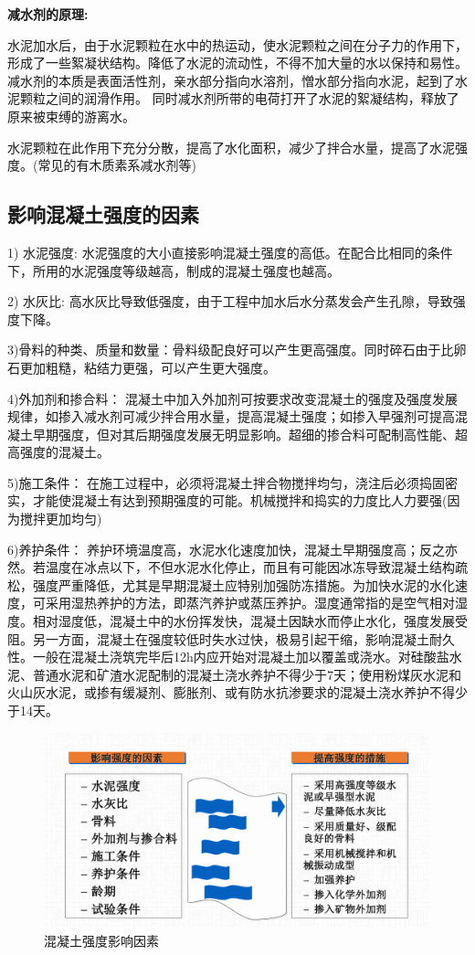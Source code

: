\documentclass[12pt, a4paper, oneside, UTF8]{ctexbook}
\begin{document}
\textbf{减水剂的原理:}

水泥加水后，由于水泥颗粒在水中的热运动，使水泥颗粒之间在分子力的作用下，形成了一些絮凝状结构。降低了水泥的流动性，不得不加大量的水以保持和易性。
减水剂的本质是表面活性剂，亲水部分指向水溶剂，憎水部分指向水泥，起到了水泥颗粒之间的润滑作用。
同时减水剂所带的电荷打开了水泥的絮凝结构，释放了原来被束缚的游离水。

水泥颗粒在此作用下充分分散，提高了水化面积，减少了拌合水量，提高了水泥强度。(常见的有木质素系减水剂等)

\subsection{影响混凝土强度的因素}

1) 水泥强度: 水泥强度的大小直接影响混凝土强度的高低。在配合比相同的条件下，所用的水泥强度等级越高，制成的混凝土强度也越高。

2) 水灰比: 高水灰比导致低强度，由于工程中加水后水分蒸发会产生孔隙，导致强度下降。

3)骨料的种类、质量和数量：骨料级配良好可以产生更高强度。同时碎石由于比卵石更加粗糙，粘结力更强，可以产生更大强度。

4)外加剂和掺合料：
混凝土中加入外加剂可按要求改变混凝土的强度及强度发展规律，如掺入减水剂可减少拌合用水量，提高混凝土强度；如掺入早强剂可提高混凝土早期强度，但对其后期强度发展无明显影响。超细的掺合料可配制高性能、超高强度的混凝土。

5)施工条件：
在施工过程中，必须将混凝土拌合物搅拌均匀，浇注后必须捣固密实，才能使混凝土有达到预期强度的可能。机械搅拌和捣实的力度比人力要强(因为搅拌更加均匀)

6)养护条件：
养护环境温度高，水泥水化速度加快，混凝土早期强度高；反之亦然。若温度在冰点以下，不但水泥水化停止，而且有可能因冰冻导致混凝土结构疏松，强度严重降低，尤其是早期混凝土应特别加强防冻措施。为加快水泥的水化速度，可采用湿热养护的方法，即蒸汽养护或蒸压养护。湿度通常指的是空气相对湿度。相对湿度低，混凝土中的水份挥发快，混凝土因缺水而停止水化，强度发展受阻。另一方面，混凝土在强度较低时失水过快，极易引起干缩，影响混凝土耐久性。一般在混凝土浇筑完毕后12h内应开始对混凝土加以覆盖或浇水。对硅酸盐水泥、普通水泥和矿渣水泥配制的混凝土浇水养护不得少于7天；使用粉煤灰水泥和火山灰水泥，或掺有缓凝剂、膨胀剂、或有防水抗渗要求的混凝土浇水养护不得少于14天。

\begin{figure}[H]
	\centering
	\includegraphics[width=0.7\linewidth]{../figure/qiangdu.png} %
	\caption{混凝土强度影响因素}
	\label{fig:qiangdudengji}
\end{figure}
\end{document}
